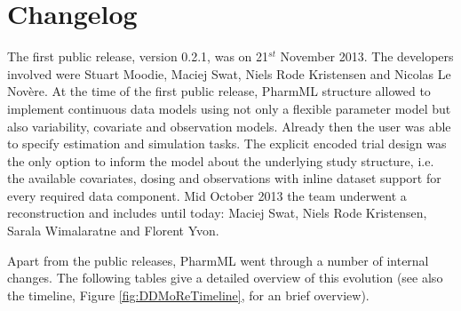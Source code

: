 \chapter{Changelog}
\label{cht:changeLog}
The first public release, version 0.2.1, was on 21$^{st}$ November 2013. The developers involved
were Stuart Moodie, Maciej Swat, Niels Rode Kristensen and Nicolas Le Nov\`{e}re. 
At the time of the first public release, PharmML structure allowed to implement continuous 
data models using not only a flexible parameter model but also variability, covariate
and observation models. Already then the user was able to specify estimation and simulation 
tasks. The explicit encoded trial design was the only option to inform the model about the underlying 
study structure, i.e. the available covariates, dosing and observations with inline dataset support
for every required data component.  
Mid October 2013 the team underwent a reconstruction and includes until today: 
Maciej Swat, Niels Rode Kristensen, Sarala Wimalaratne and Florent Yvon.

Apart from the public releases, PharmML went through a number of internal changes. 
The following tables give a detailed overview of this evolution (see also the timeline, 
Figure \ref{fig:DDMoReTimeline}, for an brief overview).

